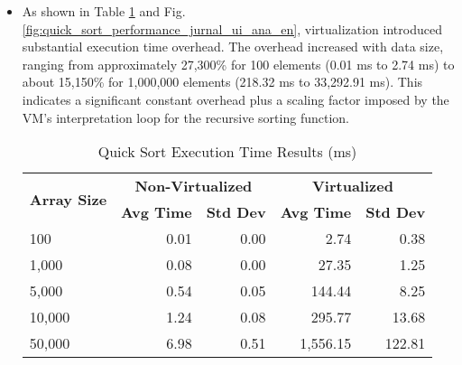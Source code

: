 \begin{itemize}
    \item {} As shown in Table \ref{tab:quick_sort_performance_jurnal_ui_ana_en} and Fig. \ref{fig:quick_sort_performance_jurnal_ui_ana_en}, virtualization introduced substantial execution time overhead. The overhead increased with data size, ranging from approximately 27,300\% for 100 elements (0.01 ms to 2.74 ms) to about 15,150\% for 1,000,000 elements (218.32 ms to 33,292.91 ms). This indicates a significant constant overhead plus a scaling factor imposed by the VM's interpretation loop for the recursive sorting function.
          \begin{table}[H]
              \centering
              \caption{Quick Sort Execution Time Results (ms)}
              \label{tab:quick_sort_performance_jurnal_ui_ana_en}
              \fontsize{10}{12}\selectfont %
                  \begin{tabular}{@{}lrrrr@{}}
                      \toprule
                      \multirow{2}{*}{\textbf{Array Size}} & \multicolumn{2}{c}{\textbf{Non-Virtualized}} & \multicolumn{2}{c}{\textbf{Virtualized}}                                        \\
                      \cmidrule(lr){2-3} \cmidrule(lr){4-5}
                                                           & \textbf{Avg Time}                            & \textbf{Std Dev}                         & \textbf{Avg Time} & \textbf{Std Dev} \\
                      \midrule
                      100                                  & 0.01                                         & 0.00                                     & 2.74              & 0.38             \\
                      1,000                                & 0.08                                         & 0.00                                     & 27.35             & 1.25             \\
                      5,000                                & 0.54                                         & 0.05                                     & 144.44            & 8.25             \\
                      10,000                               & 1.24                                         & 0.08                                     & 295.77            & 13.68            \\
                      50,000                               & 6.98                                         & 0.51                                     & 1,556.15          & 122.81           \\

\end{tabular}
\end{table}
\end{itemize}
